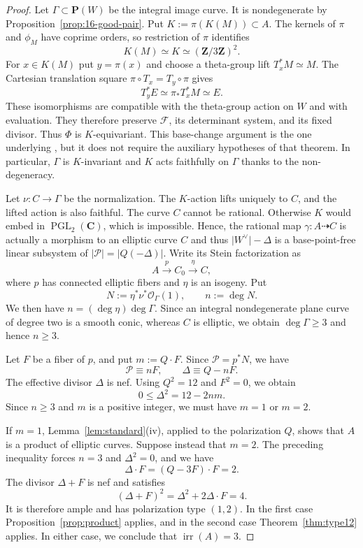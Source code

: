 \documentclass[12pt]{amsart}
\numberwithin{equation}{section}
\theoremstyle{definition}
\theoremstyle{remark}
\newcommand{\C}{\mathbf C}
\newcommand{\Z}{\mathbf Z}
\newcommand{\PP}{\mathbf P}
\newcommand{\cO}{\mathcal O}
\begin{document}
\begin{proof}
Let $\Gamma\subset\PP(W)$ be the integral image curve.  It is
nondegenerate by Proposition~\ref{prop:16-good-pair}.  Put
$K:=\pi(K(M))\subset A$.  The kernels of $\pi$ and $\phi_M$ have
coprime orders, so restriction of $\pi$ identifies
\[
                 K(M)\simeq K\simeq(\Z/3\Z)^2.
\]
For $x\in K(M)$ put $y=\pi(x)$ and choose a theta-group lift
$T_x^*M\simeq M$.  The Cartesian translation square
$\pi\circ T_x=T_y\circ\pi$ gives
\[
                     T_y^*E\simeq\pi_*T_x^*M\simeq E.
\]
These isomorphisms are compatible with the theta-group action on $W$
and with evaluation.  They therefore preserve $\mathcal F$, its
determinant system, and its fixed divisor.  Thus $\Phi$ is
$K$-equivariant.  This base-change argument is the one underlying
\cite[proof of Theorem~2.2]{GrossiMoretti}, but it does not require the
auxiliary hypotheses of that theorem.
In particular, $\Gamma$ is $K$-invariant and $K$ acts faithfully on $\Gamma$ thanks to the non-degeneracy.

Let $\nu:C\to\Gamma$ be the normalization.  The $K$-action lifts
uniquely to $C$, and the lifted action is also faithful.
The curve $C$ cannot be rational.  Otherwise $K$ would embed in
$\operatorname{PGL}_2(\C)$, which is impossible. 
Hence, the rational map $\gamma: A\dashrightarrow C$ is actually a morphism to an elliptic curve $C$ and thus $\vert W^\vee\vert-\Delta$ is a base-point-free linear subsystem of $\vert\mathcal{P}\vert = \vert Q(-\Delta )\vert$.
Write its Stein factorization as
\[
  A\xrightarrow{p}C_0\xrightarrow{\eta}C,
\]
where $p$ has connected elliptic fibers and $\eta$ is an isogeny.  Put
\[
  N:=\eta^*\nu^*\cO_\Gamma(1),
  \qquad n:=\deg N.
\]
We then have $n=(\deg\eta)\deg\Gamma$.  Since an integral nondegenerate
plane curve of degree two is a smooth conic, whereas $C$ is elliptic, we
obtain $\deg\Gamma\ge3$ and hence $n\ge3$.

Let $F$ be a fiber of $p$, and put $m:=Q\cdot F$.  Since $\mathcal{P} = p^*N$, we have
\[
  \mathcal P\equiv nF,
  \qquad
  \Delta\equiv Q-nF.
\]
The effective divisor $\Delta$ is nef.  Using $Q^2=12$ and $F^2=0$, we
obtain
\[
  0\le\Delta^2=12-2nm.
\]
Since $n\ge3$ and $m$ is a positive integer, we must have $m=1$ or
$m=2$.

If $m=1$, Lemma~\ref{lem:standard}(iv), applied to the polarization $Q$,
shows that $A$ is a product of elliptic curves.  Suppose instead that
$m=2$.  The preceding inequality forces $n=3$ and $\Delta^2=0$, and we
have
\[
  \Delta\cdot F=(Q-3F)\cdot F=2.
\]
The divisor $\Delta+F$ is nef and satisfies
\[
  (\Delta+F)^2=\Delta^2+2\Delta\cdot F=4.
\]
It is therefore ample and has polarization type $(1,2)$.  In the first
case Proposition~\ref{prop:product} applies, and in the second case
Theorem~\ref{thm:type12} applies.  In either case, we conclude that
$\operatorname{irr}(A)=3$.
\end{proof}
\end{document}
